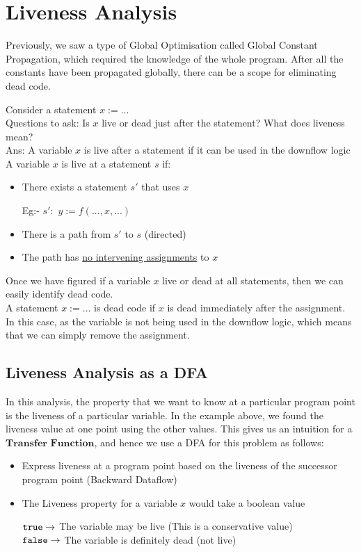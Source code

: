 \setlength{\parindent}{0pt}

\clearpage
\section{Liveness Analysis}
Previously, we saw a type of Global Optimisation called Global Constant Propagation, which required the knowledge of the whole program.
After all the constants have been propagated globally, there can be a scope for eliminating dead code.



Consider a statement $x := ...$\\
Questions to ask: Is $x$ live or dead just after the statement? What does liveness mean?\\
Ans: A variable $x$ is live after a statement if it can be used in the downflow logic\\

\vspace{0.3cm}
A variable $x$ is live at a statement $s$ if:
\begin{itemize}
    \item There exists a statement $s'$ that uses $x$
    
    Eg:- $s':$ $y := f(...,x,...)$
    \item There is a path from $s'$ to $s$ (directed)
    \item The path has \underline{no intervening assignments} to $x$
\end{itemize}

Once we have figured if a variable $x$ live or dead at all statements, then we can easily identify dead code.\\
A statement $x := ...$ is dead code if $x$ is dead immediately after the assignment.
In this case, as the variable is not being used in the downflow logic, which means that we can simply remove the assignment.

\subsection{Liveness Analysis as a DFA}
In this analysis, the property that we want to know at a particular program point is the liveness of a particular variable. In the example above, we found the liveness value at one point using the other values.
This gives us an intuition for a $\textbf{Transfer Function}$, and hence we use a DFA for this problem as follows:
\begin{itemize}
    \item Express liveness at a program point based on the liveness of the successor program point (Backward Dataflow)
    \item The Liveness property for a variable $x$ would take a boolean value
    
    \hspace*{0.1 in}${\tt true} \rightarrow$ The variable may be live (This is a conservative value)\\ 
    \hspace*{0.1 in}${\tt false} \rightarrow$ The variable is definitely dead (not live)
\end{itemize}

